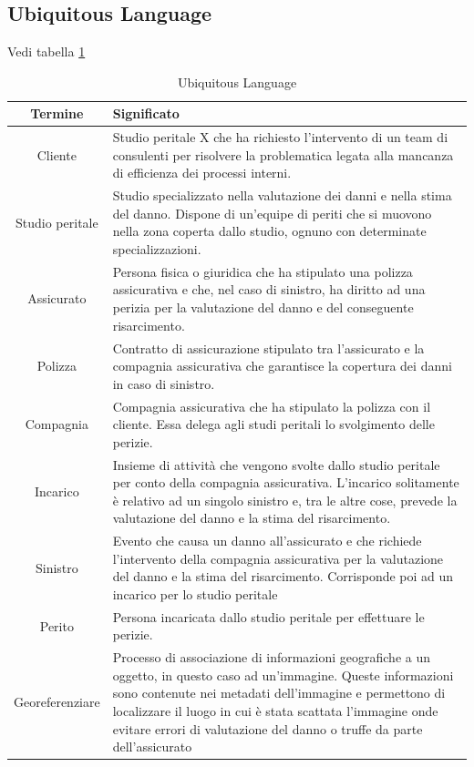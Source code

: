 \documentclass[a4paper,12pt, openright]{report}
\begin{document}
\subsection{Ubiquitous Language}
Vedi tabella \ref{tab:ubiquitous-language}
\begin{table}
        \centering
        \begin{tabularx}{1\textwidth}{ | c | >{\centering\arraybackslash}X | }
            \hline
            \textbf{Termine} & \textbf{Significato} \\
            \hline
            Cliente & Studio peritale X che ha richiesto l'intervento di un team di consulenti per risolvere la problematica legata alla mancanza di efficienza dei processi interni. \\
            \hline
            Studio peritale & Studio specializzato nella valutazione dei danni e nella stima del danno. Dispone di un'equipe di periti che si muovono nella zona coperta dallo studio, ognuno con determinate specializzazioni. \\
            \hline
            Assicurato & Persona fisica o giuridica che ha stipulato una polizza assicurativa e che, nel caso di sinistro, ha diritto ad una perizia per la valutazione del danno e del conseguente risarcimento. \\
            \hline
            Polizza & Contratto di assicurazione stipulato tra l'assicurato e la compagnia assicurativa che garantisce la copertura dei danni in caso di sinistro. \\
            \hline
            Compagnia & Compagnia assicurativa che ha stipulato la polizza con il cliente. Essa delega agli studi peritali lo svolgimento delle perizie.
            \\
            \hline
            Incarico & Insieme di attività che vengono svolte dallo studio peritale per conto della compagnia assicurativa. L'incarico solitamente è relativo ad un singolo sinistro e, tra le altre cose, prevede la valutazione del danno e la stima del risarcimento. \\
            \hline
            Sinistro & Evento che causa un danno all'assicurato e che richiede l'intervento della compagnia assicurativa per la valutazione del danno e la stima del risarcimento. Corrisponde poi ad un incarico per lo studio peritale \\
            \hline
            Perito & Persona incaricata dallo studio peritale per effettuare le perizie. \\
            \hline
            Georeferenziare & Processo di associazione di informazioni geografiche a un oggetto, in questo caso ad un'immagine. Queste informazioni sono contenute nei metadati dell'immagine e permettono di localizzare il luogo in cui è stata scattata l'immagine onde evitare errori di valutazione del danno o truffe da parte dell'assicurato \\
            \hline
        \end{tabularx}
        \caption{Ubiquitous Language}
        \label{tab:ubiquitous-language}
    \end{table}
\end{document}
